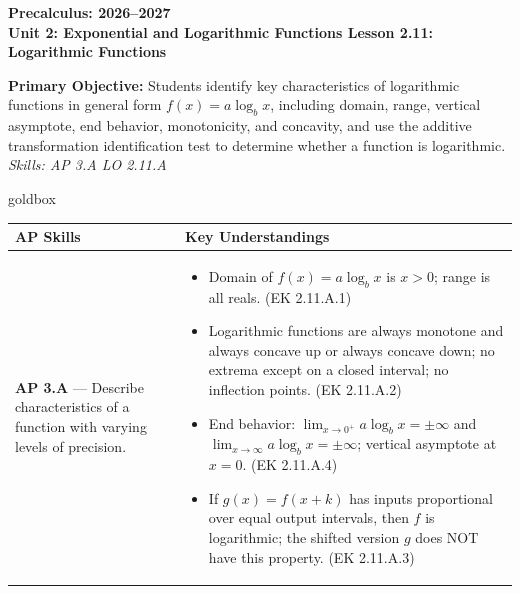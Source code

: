 \documentclass[10pt]{article}
\newcommand{\CourseName}{Precalculus}
\newcommand{\SchoolYear}{2026--2027}
\newcommand{\UnitNumberName}{Unit 2: Exponential and Logarithmic Functions \quad}
\newcommand{\LessonNumberName}{Lesson 2.11: Logarithmic Functions}
\begin{document}
\begin{center}
    {\Large\bfseries \CourseName: \SchoolYear \\
    {\small\bfseries \UnitNumberName \LessonNumberName}}
\end{center}

\begin{tcolorbox}[colback=sky, colframe=navy, boxrule=0.9pt, arc=2mm,
    left=2mm, right=2mm, top=1.5mm, bottom=1.5mm]
    \textbf{Primary Objective:} Students identify key characteristics of logarithmic functions
    in general form $f(x) = a\log_b x$, including domain, range, vertical asymptote, end
    behavior, monotonicity, and concavity, and use the additive transformation identification
    test to determine whether a function is logarithmic.
    \hfill\textit{\small Skills: AP 3.A \quad LO 2.11.A}
\end{tcolorbox}

\renewcommand{\arraystretch}{1.6}
\begin{skillbox}{goldbox}
\begin{tabularx}{\linewidth}{@{}X X@{}}
\textbf{AP Skills} &
\textbf{Key Understandings} \\
\midrule
\textbf{AP 3.A} --- Describe characteristics of a function with varying levels of precision. &
\begin{itemize}[leftmargin=1.2em,itemsep=2pt,topsep=0pt]
  \item Domain of $f(x) = a\log_b x$ is $x > 0$; range is all reals. (EK 2.11.A.1)
  \item Logarithmic functions are always monotone and always concave up or always concave
        down; no extrema except on a closed interval; no inflection points. (EK 2.11.A.2)
  \item End behavior: $\lim_{x\to 0^+} a\log_b x = \pm\infty$ and
        $\lim_{x\to\infty} a\log_b x = \pm\infty$; vertical asymptote at $x=0$. (EK 2.11.A.4)
  \item If $g(x) = f(x+k)$ has inputs proportional over equal output intervals, then
        $f$ is logarithmic; the shifted version $g$ does NOT have this property. (EK 2.11.A.3)
\end{itemize} \\
\end{tabularx}
\end{skillbox}
\end{document}
